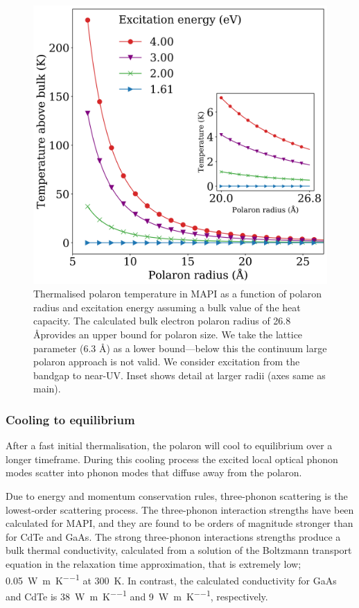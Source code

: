 \begin{figure}[h]
\centering
  \includegraphics[width=1\textwidth]{figures/ch5/f3.png}
  \caption{Thermalised polaron temperature in MAPI as a function of polaron
    radius and excitation  energy assuming a bulk value of the heat capacity. 
    The calculated bulk electron polaron radius
    of 26.8 \AA provides an upper bound for polaron size.
    We take the lattice parameter (6.3 \AA) as a lower bound---below this the
    continuum large polaron approach is not valid. 
    We consider excitation from the bandgap to near-UV. 
    Inset shows detail at larger radii (axes same as main). }
  \label{ch5TemperatureRadius}
\end{figure}


\subsubsection{Cooling to equilibrium}
After a fast initial thermalisation, the polaron will cool to equilibrium over a longer timeframe. During this cooling process the excited local optical phonon modes scatter into phonon modes that diffuse away from the polaron.

Due to energy and momentum conservation rules, three-phonon scattering is the lowest-order scattering process.  The three-phonon interaction strengths have been calculated for MAPI, \cite{} and they are found to be orders of magnitude stronger than for CdTe and GaAs. The strong three-phonon interactions strengths produce a bulk thermal conductivity, calculated from a solution of the Boltzmann transport equation in the relaxation time approximation, that is extremely low; \SI{0.05}{\watt\per\metre\per\K} at \SI{300}{\K}.\cite{Whalley2016} 
In contrast, the calculated conductivity for GaAs and CdTe is 
\SI{38}{\watt\per\metre\per\K}
and
\SI{9}{\watt\per\metre\per\K},
respectively.


